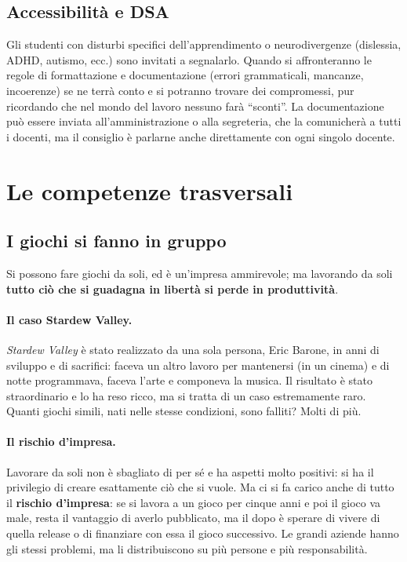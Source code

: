 \subsection{Accessibilità e DSA}

Gli studenti con disturbi specifici dell'apprendimento o neurodivergenze
(dislessia, ADHD, autismo, ecc.) sono invitati a segnalarlo. Quando si
affronteranno le regole di formattazione e documentazione (errori
grammaticali, mancanze, incoerenze) se ne terrà conto e si potranno trovare
dei compromessi, pur ricordando che nel mondo del lavoro nessuno farà
``sconti''. La documentazione può essere inviata all'amministrazione o alla
segreteria, che la comunicherà a tutti i docenti, ma il consiglio è parlarne
anche direttamente con ogni singolo docente.

\section{Le competenze trasversali}
\label{sec:soft-skill}

\subsection{I giochi si fanno in gruppo}

Si possono fare giochi da soli, ed è un'impresa ammirevole; ma lavorando da
soli \textbf{tutto ciò che si guadagna in libertà si perde in produttività}.

\paragraph{Il caso Stardew Valley.} \emph{Stardew Valley} è stato realizzato
da una sola persona, Eric Barone, in anni di sviluppo e di sacrifici: faceva
un altro lavoro per mantenersi (in un cinema) e di notte programmava, faceva
l'arte e componeva la musica. Il risultato è stato straordinario e lo ha reso
ricco, ma si tratta di un caso estremamente raro. Quanti giochi simili, nati
nelle stesse condizioni, sono falliti? Molti di più.

\paragraph{Il rischio d'impresa.} Lavorare da soli non è sbagliato di per sé
e ha aspetti molto positivi: si ha il privilegio di creare esattamente ciò che
si vuole. Ma ci si fa carico anche di tutto il \textbf{rischio d'impresa}: se
si lavora a un gioco per cinque anni e poi il gioco va male, resta il
vantaggio di averlo pubblicato, ma il dopo è sperare di vivere di quella
release o di finanziare con essa il gioco successivo. Le grandi aziende hanno
gli stessi problemi, ma li distribuiscono su più persone e più responsabilità.

